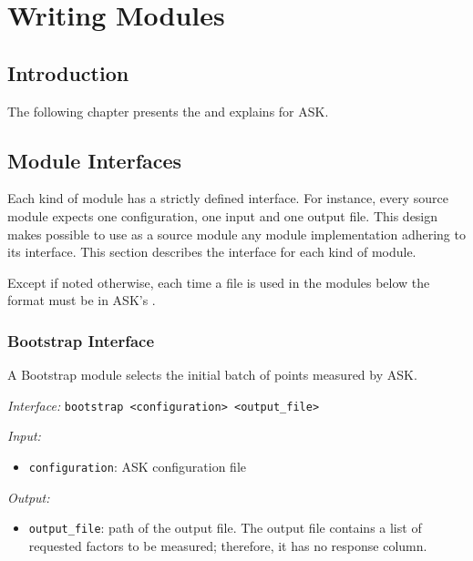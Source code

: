 \chapter{Writing Modules}
\section{Introduction}

The following chapter presents the  and explains  for ASK.

\section{Module Interfaces}

Each kind of module has a strictly defined interface. For instance, every source module expects one configuration, one input and one output file.
This design makes possible to use as a source module any module implementation adhering to its interface. 
This section describes the interface for each kind of module.

Except if noted otherwise, each time a file is used in the modules below the format must be in ASK's .

\subsection{Bootstrap Interface}

A Bootstrap module selects the initial batch of points measured by ASK.

\emph{Interface:} \texttt{bootstrap \textless{}configuration\textgreater{} \textless{}output\_file\textgreater{}} 

\emph{Input:}
\begin{itemize}
	\item \texttt{configuration}: ASK configuration file
\end{itemize}

\emph{Output:}
\begin{itemize}
	\item \texttt{output\_file}: path of the output file. The output file contains a list of requested factors to be measured; therefore, it has no response column.
\end{itemize}


